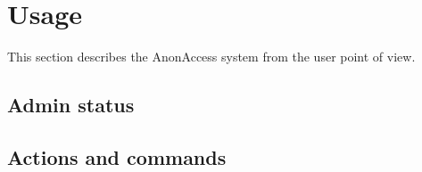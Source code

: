 \section{Usage}
This section describes the AnonAccess system from the user point of view.


\subsection{Admin status}


\subsection{Actions and commands}
